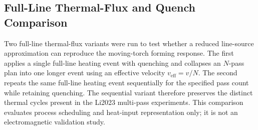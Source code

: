 \subsection{Full-Line Thermal-Flux and Quench Comparison}
\label{sec:validation-induction}

Two full-line thermal-flux variants were run to test whether a reduced line-source approximation can reproduce the moving-torch forming response. The first applies a single full-line heating event with quenching and collapses an $N$-pass plan into one longer event using an effective velocity $v_{\mathrm{eff}}=v/N$. The second repeats the same full-line heating event sequentially for the specified pass count while retaining quenching. The sequential variant therefore preserves the distinct thermal cycles present in the Li2023 multi-pass experiments. This comparison evaluates process scheduling and heat-input representation only; it is not an electromagnetic validation study.

\begin{table}[H]
\centering
\caption{Process comparison for Li2023 cases: moving torch baseline (v9), collapsed full-line thermal flux with quench (v10), and sequential full-line thermal flux with quench (v11). Values are predicted residual deflection in mm with percentage error in parentheses.}
\label{tab:li2023-process}
\scriptsize
{}
\end{table}

